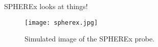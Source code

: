 SPHEREx looks at things!


\lipsum[2-6]

\begin{figure}[th]
	\centering
	\texttt{[image: spherex.jpg]}
	\caption[SPHEREx]{Simulated image of the SPHEREx probe.}
	\label{fig:spherex}
\end{figure}
